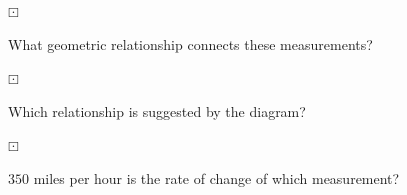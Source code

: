 \documentclass{ximera}
\begin{document}
\begin{question} $\boxdot$ 

What geometric relationship connects these measurements?

\begin{multipleChoice}
\end{multipleChoice}

\end{question}






\begin{question} $\boxdot$ 

Which relationship is suggested by the diagram?

\begin{multipleChoice}
\end{multipleChoice}

\end{question}






\begin{question} $\boxdot$ 

$350$ miles per hour is the rate of change of which measurement?

\begin{multipleChoice}
\end{multipleChoice}

\end{question}
\end{document}
